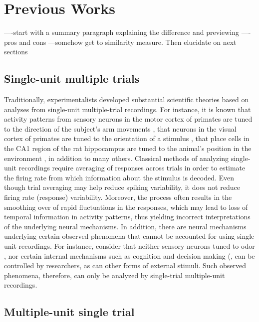 
\section{Previous Works}
----start with a summary paragraph explaining the difference and previewing 
----pros and cons 
---somehow get to similarity measure. Then elucidate on next sections




\subsection{Single-unit multiple trials}

Traditionally, experimentalists developed substantial scientific theories based on analyses from single-unit multiple-trial recordings. For instance, it is known that activity patterns from sensory neurons in the motor cortex of primates are tuned to the direction of the subject's arm movements \cite{Georgopoulos1982}, that neurons in the visual cortex of primates are tuned to the orientation of a stimulus \cite{Hubel1968}, that place cells in the CA1 region of the rat hippocampus are tuned to the animal's position in the environment \cite{OKeefe1971}, in addition to many others.
Classical  methods of analyzing single-unit recordings require averaging of responses across trials in order to estimate the firing rate from which information about the stimulus is decoded. Even though trial averaging may help reduce spiking variability, it does not reduce firing rate (response) variability.
Moreover, the process often results in the smoothing over of rapid fluctuations in the 
responses, which may lead to loss of temporal information in activity patterns, thus yielding incorrect interpretations of the underlying neural mechanisms.
In addition, there are neural mechanisms underlying certain observed phenomena 
that cannot be accounted for using single unit recordings.
For instance, consider that neither sensory neurons tuned to odor \cite{Hopfield1995},
nor certain internal mechanisms such as cognition and decision making (\cite{Redish2016,
Vos2015, Kaufman2014, Mazor2005}, can be controlled by researchers, as can other forms of external stimuli. Such observed phenomena, therefore, can only be analyzed by single-trial multiple-unit recordings. 
\newpage



\subsection{Multiple-unit single trial}

